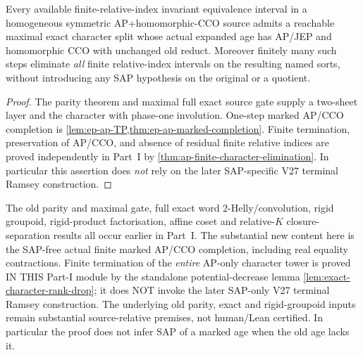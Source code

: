 \begin{corollary}
\label{cor:ep-ap-safe-splitting}
Every available finite-relative-index invariant
equivalence interval in a homogeneous symmetric
AP+homomorphic-CCO source admits a reachable
maximal exact character split whose actual
expanded age has AP/JEP and homomorphic CCO
with unchanged old reduct. Moreover finitely
many such steps eliminate \emph{all} finite
relative-index intervals on the resulting
named sorts, without introducing any SAP
hypothesis on the original or a quotient.
\end{corollary}
\begin{proof}
The parity theorem and maximal full exact
source gate supply a two-sheet layer and the
character with phase-one involution.
One-step marked AP/CCO completion is
\cref{lem:ep-ap-TP,thm:ep-ap-marked-completion}.
Finite termination, preservation of AP/CCO,
and absence of residual finite relative indices
are proved independently in Part~I by
\cref{thm:ap-finite-character-elimination}.
In particular this assertion does \emph{not}
rely on the later SAP-specific V27 terminal
Ramsey construction.
\end{proof}

\begin{remark}
\label{rem:ep-ap-source-boundary}
The old parity and maximal gate, full exact
word 2-Helly/convolution, rigid groupoid,
rigid-product factorisation, affine coset
and relative-\(K\) closure-separation
results all occur earlier in Part~I.
The substantial new content here is the
SAP-free actual finite marked AP/CCO
completion, including real equality
contractions. Finite termination of the
\emph{entire} AP-only character tower is
proved IN THIS Part-I module by the
standalone potential-decrease lemma
\cref{lem:exact-character-rank-drop};
it does NOT invoke the later SAP-only V27
terminal Ramsey construction.
The underlying old parity, exact and
rigid-groupoid inputs remain substantial
source-relative premises, not human/Lean
certified. In particular the proof
does not infer SAP of a marked age
when the old age lacks it.
\end{remark}
